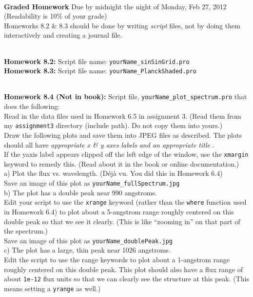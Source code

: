 \documentclass{article}
\begin{document}
\begin{spacing}{1.0}
  \par \\ 
  \textbf{Graded Homework} Due by midnight the night of Monday, Feb 27, 2012    \\ 
  (Readability is 10\% of your grade) \\ 
  Homeworks 8.2 \& 8.3 should be done by writing  \emph{script}  files, not by doing them interactively and creating a journal file. \\ 
  \par \\ 
  \textbf{Homework 8.2:}  Script file name:  \verb|yourName_sinSinGrid.pro| \\ 
  \textbf{Homework 8.3:}  Script file name:  \verb|yourName_PlanckShaded.pro| \\ 
  \par \\ 
  \textbf{Homework 8.4 (Not in book):}  Script file,  \verb|yourName_plot_spectrum.pro|  that does the following: \\ 
  Read in the data files used in Homework 6.5 in assignment 3.   (Read them from my  \verb|assignment3|  directory (include path).   Do not copy them into yours.) \\ 
  Draw the following plots and save them into JPEG files as described.   The plots should all have  \emph{appropriate x \& y axes labels and an appropriate title} . \\ 
  If the yaxis label appears clipped off the left edge of the window, use the  \verb|xmargin|  keyword to remedy this.   (Read about it in the book or online documentation.) \\ 
  a) Plot the flux vs. wavelength.   (Déjà vu.   You did this in Homework 6.4) \\ 
  Save an image of this plot as  \verb|yourName_fullSpectrum.jpg| \\ 
  b) The plot has a double peak near 990 angstroms.    \\ 
  Edit your script to use the  \verb|xrange|  keyword (rather than the  \verb|where|  function used in Homework 6.4) to plot about a 5-angstrom range roughly centered on this double peak so that we see it clearly.   (This is like “zooming in” on that part of the spectrum.) \\ 
  Save an image of this plot as  \verb|yourName_doublePeak.jpg| \\ 
  c) The plot has a large, thin peak near 1026 angstroms. \\ 
  Edit the script to use the range keywords to plot about a 1-angstrom range roughly centered on this double peak.   This plot should also have a flux range of about  \verb|1e-12|  flux units so that we can clearly see the structure at this peak.   (This means setting a  \verb|yrange|  as well.) \\ 

\end{spacing}
\end{document}
